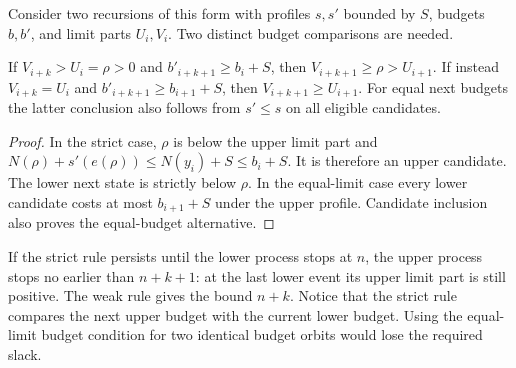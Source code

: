 Consider two recursions of this form with profiles \(s,s'\) bounded by
\(S\), budgets \(b,b'\), and limit parts \(U_i,V_i\).
Two distinct budget comparisons are needed.

\begin{lemma}[Propagation]\label{lem:propagation}
If \(V_{i+k}>U_i=\rho>0\) and
\(b'_{i+k+1}\ge b_i+S\), then
\(V_{i+k+1}\ge\rho>U_{i+1}\).
If instead \(V_{i+k}=U_i\) and
\(b'_{i+k+1}\ge b_{i+1}+S\), then
\(V_{i+k+1}\ge U_{i+1}\).
For equal next budgets the latter conclusion also follows from
\(s'\le s\) on all eligible candidates.
\end{lemma}
\begin{proof}
In the strict case, \(\rho\) is below the upper limit part and
\(N(\rho)+s'(e(\rho))\le N(y_i)+S\le b_i+S\).
It is therefore an upper candidate. The lower next state is strictly
below \(\rho\). In the equal-limit case every lower candidate costs
at most \(b_{i+1}+S\) under the upper profile. Candidate inclusion
also proves the equal-budget alternative.
\end{proof}

If the strict rule persists until the lower process stops at \(n\), the
upper process stops no earlier than \(n+k+1\): at the last lower event
its upper limit part is still positive. The weak rule gives the bound
\(n+k\). Notice that the strict rule compares the next upper budget
with the current lower budget. Using the equal-limit budget condition
for two identical budget orbits would lose the required slack.

